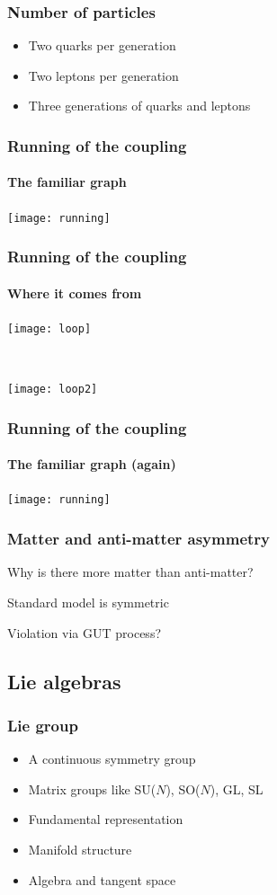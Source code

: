 \documentclass[english, fleqn]{beamer}
\begin{document}
\begin{frame}
    \frametitle{Number of particles}

    \begin{itemize}
        \item Two quarks per generation
        \item Two leptons per generation
        \item Three generations of quarks and leptons
    \end{itemize}
\end{frame}

\begin{frame}
    \frametitle{Running of the coupling}
    \framesubtitle{The familiar graph}

    {
        \centering
        \texttt{[image: running]}
    }

    \parencite{Peskin/1997ez}
\end{frame}

\begin{frame}
    \frametitle{Running of the coupling}
    \framesubtitle{Where it comes from}

    \texttt{[image: loop]} 

    \

    \texttt{[image: loop2]} 
\end{frame}

\begin{frame}
    \frametitle{Running of the coupling}
    \framesubtitle{The familiar graph (again)}

    {
        \centering
        \texttt{[image: running]}
    }

    \parencite{Peskin/1997ez}
\end{frame}

\begin{frame}
    \frametitle{Matter and anti-matter asymmetry}

    Why is there more matter than anti-matter?

    Standard model is symmetric

    Violation via GUT process?
\end{frame}

\subsection{Lie algebras}

\begin{frame}
    \frametitle{Lie group}

    \begin{itemize}
        \item A continuous symmetry group
        \item Matrix groups like SU($N$), SO($N$), GL, SL
        \item Fundamental representation
        \item Manifold structure
        \item Algebra and tangent space
    \end{itemize}

\end{frame}
\end{document}
